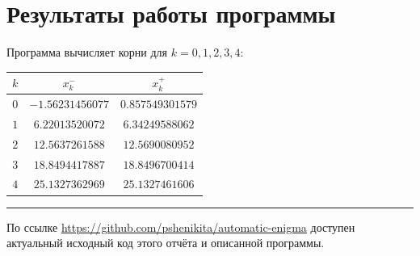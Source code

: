 \documentclass[a5paper, leqno, 10pt]{article}
\begin{document}
\clearpage

\section{Результаты работы программы}

Программа вычисляет корни для $k = 0, 1, 2, 3, 4$:

\begin{center}
	\begin{tabular}{c|cc}
		$k$ & $x_k^-$          & $x_k^+$          \\[.5mm]
		\hline
		$0$ & $-1.56231456077$ & $0.857549301579$ \\
		$1$ & $6.22013520072$  & $6.34249588062$  \\
		$2$ & $12.5637261588$  & $12.5690080952$  \\
		$3$ & $18.8494417887$  & $18.8496700414$  \\
		$4$ & $25.1327362969$  & $25.1327461606$
	\end{tabular}
\end{center}

\medskip
\hrule
\medskip

По ссылке \url{https://github.com/pshenikita/automatic-enigma} доступен актуальный исходный код этого отчёта и описанной программы.
\end{document}
